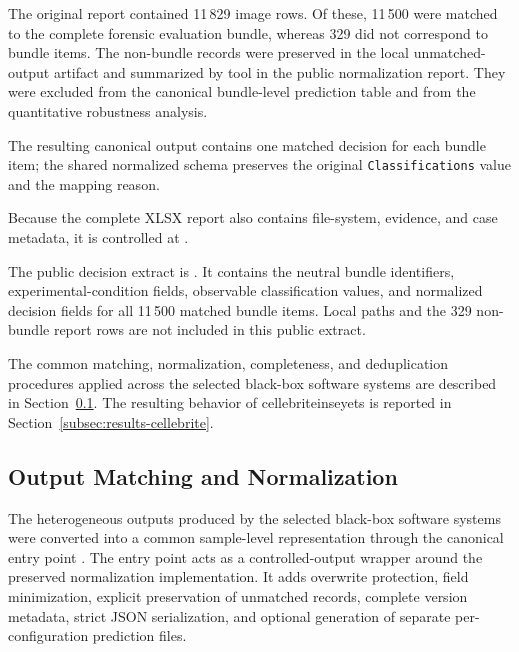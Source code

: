 The original report contained 11\,829 image rows. Of these, 11\,500 were
matched to the complete forensic evaluation bundle, whereas 329 did not
correspond to bundle items. The non-bundle records were preserved in the local
unmatched-output artifact and summarized by tool in the public normalization
report. They were excluded from the canonical bundle-level prediction table
and from the quantitative robustness analysis.

The resulting canonical output contains one matched decision for each bundle
item; the shared normalized schema preserves the original
\texttt{Classifications} value and the mapping reason.

Because the complete XLSX report also contains file-system, evidence, and case
metadata, it is controlled at
.

The public decision extract is
.
It contains the neutral bundle identifiers, experimental-condition fields,
observable classification values, and normalized decision fields for all
11\,500 matched bundle items. Local paths and the 329 non-bundle report rows are
not included in this public extract.

The common matching, normalization, completeness, and deduplication procedures
applied across the selected black-box software systems are described in
Section~\ref{subsec:implementation-normalization}. The resulting behavior of
\gls{cellebriteinseyets} is reported in
Section~\ref{subsec:results-cellebrite}.


\subsection{Output Matching and Normalization}
\label{subsec:implementation-normalization}

The heterogeneous outputs produced by the selected black-box software systems
were converted into a common sample-level representation through the canonical
entry point
.
The entry point acts as a controlled-output wrapper around the preserved
normalization implementation. It adds overwrite protection, field
minimization, explicit preservation of unmatched records, complete version
metadata, strict JSON serialization, and optional generation of separate
per-configuration prediction files.


